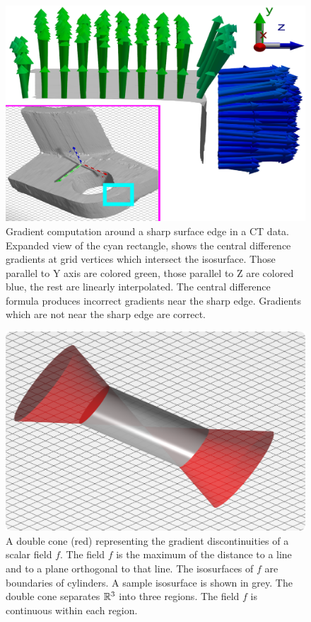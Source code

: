 \begin{figure}
	\begin{center}
\includegraphics[width=0.5\linewidth]{images/setA.crop2.cdiff.new.eps}
	\caption{Gradient computation around a sharp surface edge in a CT data.
        Expanded view of the cyan rectangle, shows the central difference gradients at grid vertices which intersect the isosurface. Those parallel to Y axis are colored green, those parallel to Z are colored blue, the rest are linearly interpolated. The central difference formula produces incorrect gradients near the sharp edge. Gradients which are not near the sharp
        edge are correct.}
	\label{fig:grad-1}
    \end{center}
\end{figure}
\begin{figure}
	\centering
  \includegraphics[width=0.5\linewidth]{images/2cone.eps}
  \caption{A double cone (red) representing the gradient discontinuities
 of a scalar field $f$.
 The field $f$ is the maximum of the distance to a line 
 and to a plane orthogonal to that line.
 The isosurfaces of $f$ are boundaries of cylinders.
 A sample isosurface is shown in grey.
 The double cone separates $\mathbb{R}^{3}$ into three regions.
 The field $f$ is continuous within each region.}
	\label{fig:double_cone}
\end{figure}

